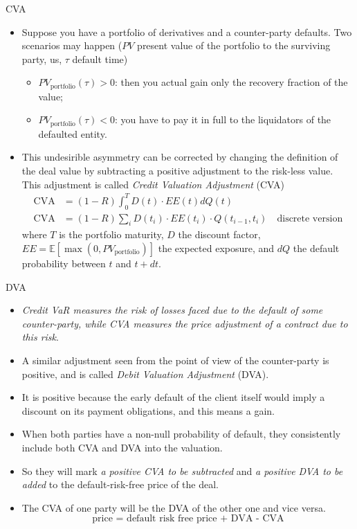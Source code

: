 \documentclass{beamer}
\begin{document}
\begin{frame}{CVA}
  \begin{itemize}
  \item Suppose you have a portfolio of derivatives and a counter-party defaults. Two scenarios may happen ($PV$ present value of the portfolio to the surviving party, us, $\tau$ default time)
    \begin{itemize}
    \item $PV_{\textrm{portfolio}}(\tau) > 0$: then you actual gain only the recovery fraction of the value;
    \item $PV_{\textrm{portfolio}}(\tau) < 0$: you have to pay it in full to the liquidators of the defaulted entity.
    \end{itemize}
  \item This undesirible asymmetry can be corrected by changing the definition of the deal value by subtracting a positive adjustment to the risk-less value. This adjustment is called \emph{Credit Valuation Adjustment} (CVA)
\begin{align*}
  \textrm{CVA} &= (1-R)\int_0^{T} D(t)\cdot EE(t) dQ(t) \\
  \textrm{CVA} &= (1-R)\sum_i D(t_i)\cdot EE(t_i)\cdot  Q(t_{i-1}, t_i) \quad \textrm{discrete version}
\end{align*}
where $T$ is the portfolio maturity, $D$ the discount factor, $EE=\mathbb{E}[\max(0, PV_{\textrm{portfolio}})]$ the expected exposure, and $dQ$ the default probability between $t$ and $t + dt$.
  \end{itemize}
\end{frame}

\begin{frame}{DVA}
  \begin{itemize}
  \item \emph{Credit VaR measures the risk of losses faced due to the default of some counter-party, while CVA measures the price adjustment of a contract due to this risk}.
  \item A similar adjustment seen from the point of view of the counter-party is positive, and is called \emph{Debit Valuation Adjustment} (DVA). 
  \item It is positive because the early default of the client itself would imply a discount on its payment obligations, and this means a gain.
  \item When both parties have a non-null probability of default, they consistently include both CVA and DVA into the valuation.
  \item So they will mark \emph{a positive CVA to be subtracted} and \emph{a positive DVA to be added} to the default-risk-free price of the deal. 
  \item The CVA of one party will be the DVA of the other one and vice versa.
    \begin{equation*}
      \textrm{price = default risk free price + DVA - CVA}
    \end{equation*}
  \end{itemize}
\end{frame}
\end{document}
